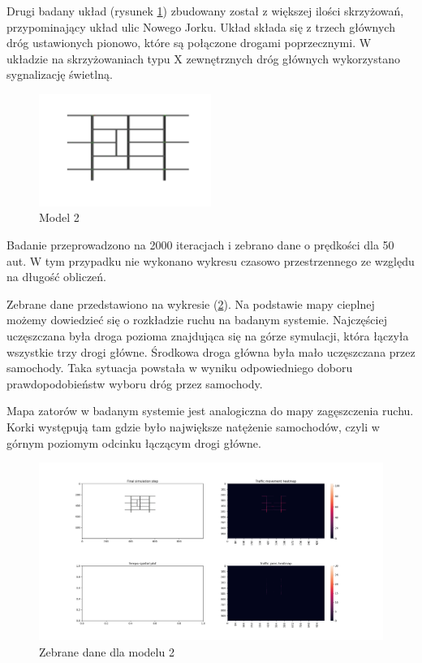 \documentclass{article}
\begin{document}
Drugi badany układ (rysunek \ref{fig:model_sredni}) zbudowany został z większej ilości skrzyżowań, przypominający układ ulic Nowego Jorku. Układ składa się z trzech głównych dróg ustawionych pionowo, które są połączone drogami poprzecznymi. W układzie na skrzyżowaniach typu X zewnętrznych dróg głównych wykorzystano sygnalizację świetlną.

\begin{figure}[H]
    \centering
    \includegraphics[width=0.5\textwidth]{images/modele/medium.png}
    \caption{Model 2}
    \label{fig:model_sredni}
\end{figure}

 Badanie przeprowadzono na 2000 iteracjach i zebrano dane o prędkości dla 50 aut. W tym przypadku nie wykonano wykresu czasowo przestrzennego ze względu na długość obliczeń. 
 
 Zebrane dane przedstawiono na wykresie (\ref{fig:dane_sredni}). Na podstawie mapy cieplnej możemy dowiedzieć się o rozkładzie ruchu na badanym systemie. Najczęściej uczęszczana była droga pozioma znajdująca się na górze symulacji, która łączyła wszystkie trzy drogi główne. Środkowa droga główna była mało uczęszczana przez samochody. Taka sytuacja powstała w wyniku odpowiedniego doboru prawdopodobieństw wyboru dróg przez samochody. 
 
Mapa zatorów w badanym systemie jest analogiczna do mapy zagęszczenia ruchu. Korki występują tam gdzie było największe natężenie samochodów, czyli w górnym poziomym odcinku łączącym drogi główne.
 
 \begin{figure}[H]
    \centering
    \includegraphics[width=1\textwidth]{images/medium_model.png}
    \caption{Zebrane dane dla modelu 2}
    \label{fig:dane_sredni}
\end{figure}
\end{document}
